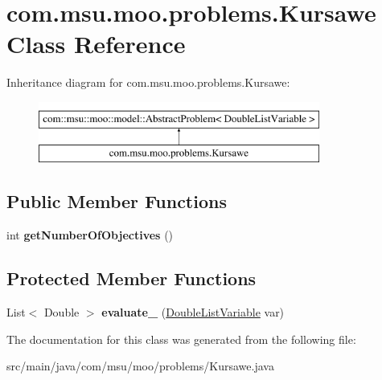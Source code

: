 \hypertarget{classcom_1_1msu_1_1moo_1_1problems_1_1Kursawe}{\section{com.\-msu.\-moo.\-problems.\-Kursawe Class Reference}
\label{classcom_1_1msu_1_1moo_1_1problems_1_1Kursawe}
}
Inheritance diagram for com.\-msu.\-moo.\-problems.\-Kursawe\-:\begin{figure}[H]
\begin{center}
\leavevmode
\includegraphics[height=2.000000cm]{classcom_1_1msu_1_1moo_1_1problems_1_1Kursawe}
\end{center}
\end{figure}
\subsection*{Public Member Functions}
\begin{DoxyCompactItemize}
\item 
\hypertarget{classcom_1_1msu_1_1moo_1_1problems_1_1Kursawe_a0ec3c4c0209e1d26179832f4a40a4f2f}{int {\bfseries get\-Number\-Of\-Objectives} ()}\label{classcom_1_1msu_1_1moo_1_1problems_1_1Kursawe_a0ec3c4c0209e1d26179832f4a40a4f2f}

\end{DoxyCompactItemize}
\subsection*{Protected Member Functions}
\begin{DoxyCompactItemize}
\item 
\hypertarget{classcom_1_1msu_1_1moo_1_1problems_1_1Kursawe_ae7fc8a190a7ce2ae30ef0c6c2689bc78}{List$<$ Double $>$ {\bfseries evaluate\-\_\-} (\hyperlink{classcom_1_1msu_1_1moo_1_1model_1_1variables_1_1DoubleListVariable}{Double\-List\-Variable} var)}\label{classcom_1_1msu_1_1moo_1_1problems_1_1Kursawe_ae7fc8a190a7ce2ae30ef0c6c2689bc78}

\end{DoxyCompactItemize}


The documentation for this class was generated from the following file\-:\begin{DoxyCompactItemize}
\item 
src/main/java/com/msu/moo/problems/Kursawe.\-java\end{DoxyCompactItemize}
